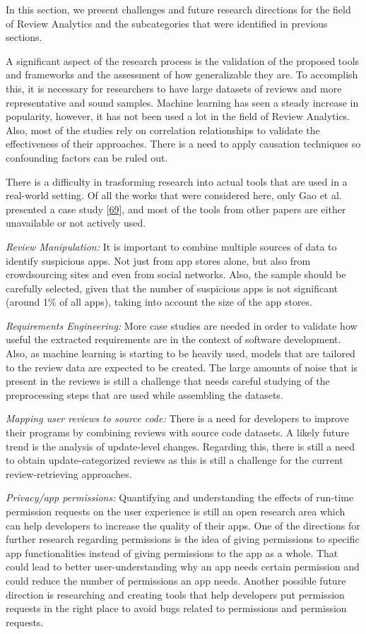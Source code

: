 \documentclass[]{book}
\begin{document}
In this section, we present challenges and future research directions
for the field of Review Analytics and the subcategories that were
identified in previous sections.

A significant aspect of the research process is the validation of the
proposed tools and frameworks and the assessment of how generalizable
they are. To accomplish this, it is necessary for researchers to have
large datasets of reviews and more representative and sound samples.
Machine learning has seen a steady increase in popularity, however, it
has not been used a lot in the field of Review Analytics. Also, most of
the studies rely on correlation relationships to validate the
effectiveness of their approaches. There is a need to apply causation
techniques so confounding factors can be ruled out.

There is a difficulty in trasforming research into actual tools that are
used in a real-world setting. Of all the works that were considered
here, only Gao et al. presented a case study
{[}\protect\hyperlink{ref-gao2018online}{69}{]}, and most of the tools
from other papers are either unavailable or not actively used.

\emph{Review Manipulation:} It is important to combine multiple sources
of data to identify suspicious apps. Not just from app stores alone, but
also from crowdsourcing sites and even from social networks. Also, the
sample should be carefully selected, given that the number of suspicious
apps is not significant (around 1\% of all apps), taking into account
the size of the app stores.

\emph{Requirements Engineering:} More case studies are needed in order
to validate how useful the extracted requirements are in the context of
software development. Also, as machine learning is starting to be
heavily used, models that are tailored to the review data are expected
to be created. The large amounts of noise that is present in the reviews
is still a challenge that needs careful studying of the preprocessing
steps that are used while assembling the datasets.

\emph{Mapping user reviews to source code:} There is a need for
developers to improve their programs by combining reviews with source
code datasets. A likely future trend is the analysis of update-level
changes. Regarding this, there is still a need to obtain
update-categorized reviews as this is still a challenge for the current
review-retrieving approaches.

\emph{Privacy/app permissions:} Quantifying and understanding the
effects of run-time permission requests on the user experience is still
an open research area which can help developers to increase the quality
of their apps. One of the directions for further research regarding
permissions is the idea of giving permissions to specific app
functionalities instead of giving permissions to the app as a whole.
That could lead to better user-understanding why an app needs certain
permission and could reduce the number of permissions an app needs.
Another possible future direction is researching and creating tools that
help developers put permission requests in the right place to avoid bugs
related to permissions and permission requests.
\end{document}
